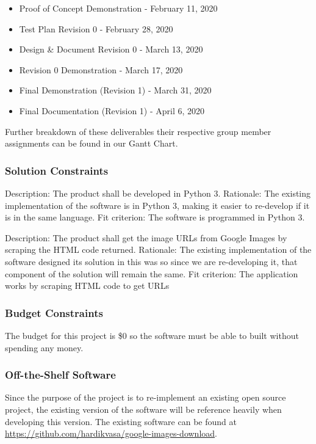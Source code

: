 \documentclass[12pt, titlepage]{article}
\begin{document}
\begin{itemize}
    \item Proof of Concept Demonstration - February 11, 2020
    \item Test Plan Revision 0 - February 28, 2020
    \item Design \& Document Revision 0 - March 13, 2020
    \item Revision 0 Demonstration - March 17, 2020
    \item Final Demonstration (Revision 1) - March 31, 2020
    \item Final Documentation (Revision 1) - April 6, 2020
\end{itemize}

Further breakdown of these deliverables their respective group member assignments can be found in our Gantt Chart.

\subsubsection{Solution Constraints}

Description: The product shall be developed in Python 3.
Rationale: The existing implementation of the software is in Python 3, making it easier to re-develop if it is in the same language.
Fit criterion: The software is programmed in Python 3.

Description: The product shall get the image URLs from Google Images by scraping the HTML code returned.
Rationale: The existing implementation of the software designed its solution in this was so since we are re-developing it, that component of the solution will remain the same.
Fit criterion: The application works by scraping HTML code to get URLs

\subsubsection{Budget Constraints}

The budget for this project is \$0 so the software must be able to built without spending any money.

\subsubsection{Off-the-Shelf Software}

Since the purpose of the project is to re-implement an existing open source project, the existing version of the software will be reference heavily when developing this version. The existing software can be found at \url{https://github.com/hardikvasa/google-images-download}.
\end{document}
